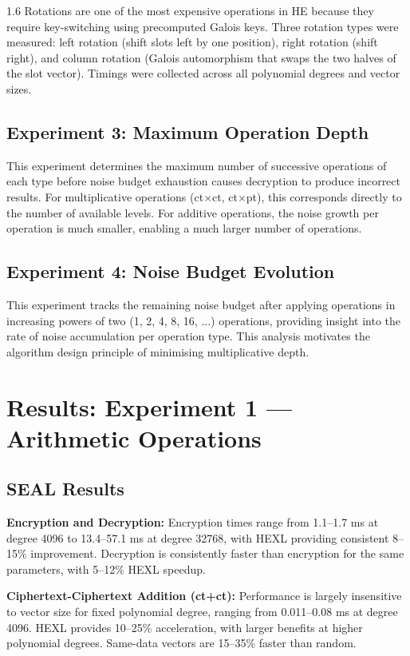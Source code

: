 \begin{spacing}{1.6}
Rotations are one of the most expensive operations in HE because they require
key-switching using precomputed Galois keys. Three rotation types were measured:
left rotation (shift slots left by one position), right rotation (shift right),
and column rotation (Galois automorphism that swaps the two halves of the slot
vector). Timings were collected across all polynomial degrees and vector sizes.

\subsection{Experiment 3: Maximum Operation Depth}

This experiment determines the maximum number of successive operations of each
type before noise budget exhaustion causes decryption to produce incorrect
results. For multiplicative operations (ct$\times$ct, ct$\times$pt), this
corresponds directly to the number of available levels. For additive operations,
the noise growth per operation is much smaller, enabling a much larger number
of operations.

\subsection{Experiment 4: Noise Budget Evolution}

This experiment tracks the remaining noise budget after applying operations in
increasing powers of two (1, 2, 4, 8, 16, ...) operations, providing insight
into the rate of noise accumulation per operation type. This analysis motivates
the algorithm design principle of minimising multiplicative depth.

\section{Results: Experiment 1 --- Arithmetic Operations}

\subsection{SEAL Results}

\textbf{Encryption and Decryption:} Encryption times range from 1.1--1.7 ms
at degree 4096 to 13.4--57.1 ms at degree 32768, with HEXL providing consistent
8--15\% improvement. Decryption is consistently faster than encryption for the
same parameters, with 5--12\% HEXL speedup.

\textbf{Ciphertext-Ciphertext Addition (ct+ct):} Performance is largely
insensitive to vector size for fixed polynomial degree, ranging from 0.011--0.08
ms at degree 4096. HEXL provides 10--25\% acceleration, with larger benefits
at higher polynomial degrees. Same-data vectors are 15--35\% faster than random.


\end{spacing}
